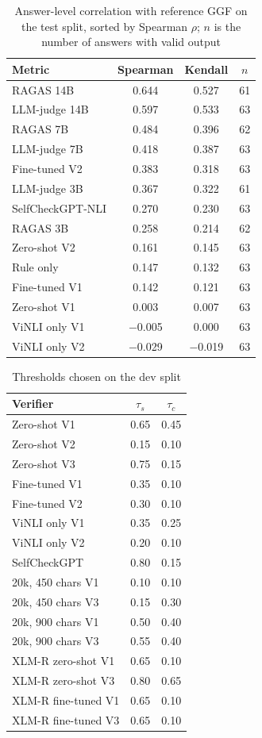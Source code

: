\documentclass[conference]{IEEEtran}
\begin{document}
\begin{table}[t]
\caption{Answer-level correlation with reference GGF on the test split, sorted by Spearman $\rho$; $n$ is the number of answers with valid output}
\label{tab:corr}
\centering
\footnotesize
\begin{tabular}{lccc}
\toprule
Metric & Spearman & Kendall & $n$ \\
\midrule
RAGAS 14B & 0.644 & 0.527 & 61 \\
LLM-judge 14B & 0.597 & 0.533 & 63 \\
RAGAS 7B & 0.484 & 0.396 & 62 \\
LLM-judge 7B & 0.418 & 0.387 & 63 \\
Fine-tuned V2 & 0.383 & 0.318 & 63 \\
LLM-judge 3B & 0.367 & 0.322 & 61 \\
SelfCheckGPT-NLI & 0.270 & 0.230 & 63 \\
RAGAS 3B & 0.258 & 0.214 & 62 \\
Zero-shot V2 & 0.161 & 0.145 & 63 \\
Rule only & 0.147 & 0.132 & 63 \\
Fine-tuned V1 & 0.142 & 0.121 & 63 \\
Zero-shot V1 & 0.003 & 0.007 & 63 \\
ViNLI only V1 & $-$0.005 & 0.000 & 63 \\
ViNLI only V2 & $-$0.029 & $-$0.019 & 63 \\
\bottomrule
\end{tabular}
\end{table}

\begin{table}[t]
\caption{Thresholds chosen on the dev split}
\label{tab:th}
\centering
\footnotesize
\begin{tabular}{lcc}
\toprule
Verifier & $\tau_s$ & $\tau_c$ \\
\midrule
Zero-shot V1 & 0.65 & 0.45 \\
Zero-shot V2 & 0.15 & 0.10 \\
Zero-shot V3 & 0.75 & 0.15 \\
Fine-tuned V1 & 0.35 & 0.10 \\
Fine-tuned V2 & 0.30 & 0.10 \\
ViNLI only V1 & 0.35 & 0.25 \\
ViNLI only V2 & 0.20 & 0.10 \\
SelfCheckGPT & 0.80 & 0.15 \\
20k, 450 chars V1 & 0.10 & 0.10 \\
20k, 450 chars V3 & 0.15 & 0.30 \\
20k, 900 chars V1 & 0.50 & 0.40 \\
20k, 900 chars V3 & 0.55 & 0.40 \\
XLM-R zero-shot V1 & 0.65 & 0.10 \\
XLM-R zero-shot V3 & 0.80 & 0.65 \\
XLM-R fine-tuned V1 & 0.65 & 0.10 \\
XLM-R fine-tuned V3 & 0.65 & 0.10 \\
\bottomrule
\end{tabular}
\end{table}
\end{document}
